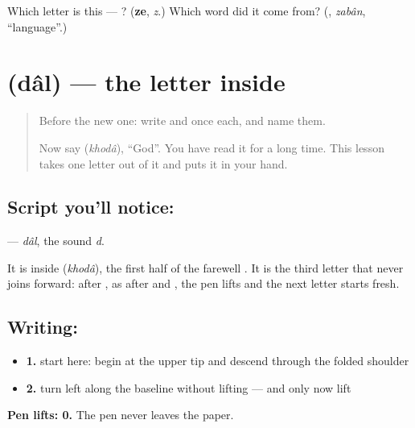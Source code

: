 \begin{tcolorbox}[breakable,colback=teal!4,colframe=teal!35!black,title={Before you move on}]
Which letter is this — ? (\textbf{ze}, \emph{z}.) Which word did it come from? (\textbf{}, \emph{zabân}, \textquotedblleft{}language\textquotedblright{}.)
\end{tcolorbox}
\section[\texorpdfstring{\fa{د} (dâl)}{د (dâl)}]{ (dâl) — the letter inside }

\label{lesson:FA-W22-dal}



\begin{quote}
Before the new one: write  and  once each, and name them.

Now say \textbf{} (\emph{khodâ}), \textquotedblleft{}God\textquotedblright{}. You have read it for a long time. This lesson takes one letter out of it and puts it in your hand.
\end{quote}

\subsection*{Script you'll notice: }
\textbf{} — \emph{dâl}, the sound \emph{d}.

It is inside \textbf{} (\emph{khodâ}), the first half of the farewell \textbf{ }. It is the third letter that never joins forward: after \textbf{}, as after \textbf{} and \textbf{}, the pen lifts and the next letter starts fresh.

\subsection*{Writing: }

\begin{itemize}
\raggedright
  \item \textbf{1.} start here: begin at the upper tip and descend through the folded shoulder
  \item \textbf{2.} turn left along the baseline without lifting — and only now lift
\end{itemize}

\textbf{Pen lifts: 0.} The pen never leaves the paper.


